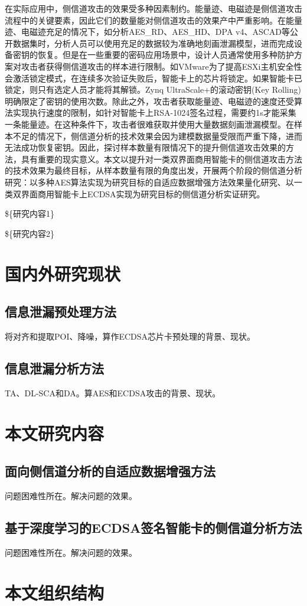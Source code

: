 {	在实际应用中，侧信道攻击的效果受多种因素制约。能量迹、电磁迹是侧信道攻击流程中的关键要素，因此它们的数量能对侧信道攻击的效果产中严重影响。在能量迹、电磁迹充足的情况下，如分析AES\_RD\citep{AESRD}、AES\_HD\citep{AESHD}、DPA v4\citep{dpav4}、ASCAD\citep{ASCAD}等公开数据集时，分析人员可以使用充足的数据较为准确地刻画泄漏模型，进而完成设备密钥的恢复。但是在一些重要的密码应用场景中，设计人员通常使用多种防护方案对攻击者获得侧信道攻击的样本进行限制。如VMware为了提高ESXi主机安全性会激活锁定模式，在连续多次验证失败后，智能卡上的芯片将锁定。如果智能卡已锁定，则只有选定人员才能将其解锁\citep{GUID-04636353-4A11-4874-9D59-7F4F4E5CF1F}。Zynq UltraScale+的滚动密钥(Key Rolling)明确限定了密钥的使用次数\citep{UG1085}。除此之外，攻击者获取能量迹、电磁迹的速度还受算法实现执行速度的限制，如针对智能卡上RSA-1024签名过程，需要约1s才能采集一条能量迹。在这种条件下，攻击者很难获取并使用大量数据刻画泄漏模型。在样本不足的情况下，侧信道分析的技术效果会因为建模数据量受限而严重下降，进而无法成功恢复密钥。因此，探讨样本数量有限情况下的提升侧信道攻击效果的方法，具有重要的现实意义。本文以提升对一类双界面商用智能卡的侧信道攻击方法的技术效果为最终目标，从样本数量有限的角度出发，开展两个阶段的侧信道分析研究：以多种AES算法实现为研究目标的自适应数据增强方法效果量化研究、以一类双界面商用智能卡上ECDSA实现为研究目标的侧信道分析实证研究。
	
	\$\{研究内容1\}
	
	\$\{研究内容2\}
	\section{国内外研究现状}
	
	\subsection{信息泄漏预处理方法}
	将对齐和提取POI、降噪，算作ECDSA芯片卡预处理的背景、现状。
	\subsection{信息泄漏分析方法}
	TA、DL-SCA和DA。算AES和ECDSA攻击的背景、现状。
	\section{本文研究内容}
	\subsection{面向侧信道分析的自适应数据增强方法}
	问题困难性所在。解决问题的效果。
	\subsection{基于深度学习的ECDSA签名智能卡的侧信道分析方法}
	问题困难性所在。解决问题的效果。
	\section{本文组织结构}
}